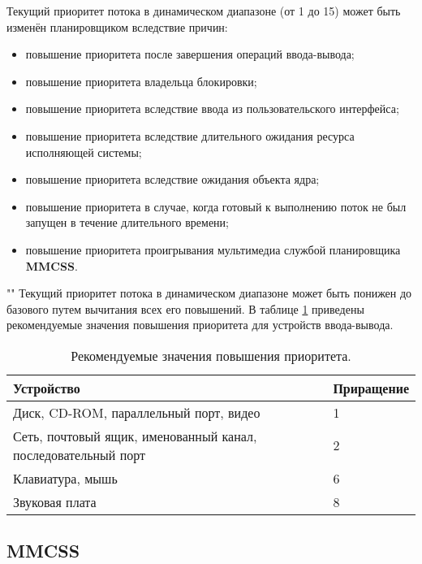 \noindent Текущий приоритет потока в динамическом диапазоне (от 1 до 15) может быть изменён планировщиком вследствие причин:

\begin{itemize}
    \item повышение приоритета после завершения операций ввода-вывода;
    \item повышение приоритета владельца блокировки;
    \item повышение приоритета вследствие ввода из пользовательского интерфейса;
    \item повышение приоритета вследствие длительного ожидания ресурса исполняющей системы;
    \item повышение приоритета вследствие ожидания объекта ядра;
    \item повышение приоритета в случае, когда готовый к выполнению поток не был запущен в течение длительного времени;
    \item повышение приоритета проигрывания мультимедиа службой планировщика \textbf{MMCSS}.
\end{itemize}

""\newline 
\noindent Текущий приоритет потока в динамическом диапазоне может быть понижен до базового путем вычитания всех его повышений. В таблице \ref{tab:io} приведены рекомендуемые значения повышения приоритета для устройств ввода-вывода.

\begin{table}[h!]
    \caption{Рекомендуемые значения повышения приоритета.}
    \begin{center}
        \begin{tabular}{|p{100mm}|l|}
            \hline
            \textbf{Устройство} & \textbf{Приращение} \\
            \hline
            Диск, CD-ROM, параллельный порт, видео & 1 \\
            \hline
            Сеть, почтовый ящик, именованный канал, последовательный порт & 2 \\
            \hline
            Клавиатура, мышь & 6 \\
            \hline
            Звуковая плата & 8 \\
            \hline
        \end{tabular}
    \end{center}
    \label{tab:io}
\end{table}

\subsection{MMCSS}

